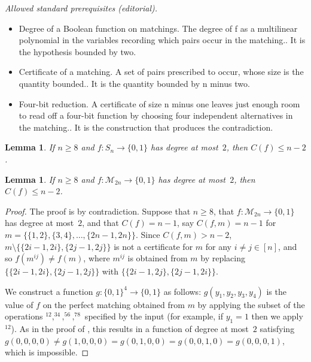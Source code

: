 \documentclass[10pt,a4paper]{article}
\newtheorem{lemma}[theorem]{Lemma}
\theoremstyle{definition}
\providecommand{\cM}{\mathcal{M}}
\begin{document}
\noindent\textit{Allowed standard prerequisites (editorial).}\begin{itemize}
\item Degree of a Boolean function on matchings. The degree of f as a multilinear polynomial in the variables recording which pairs occur in the matching.. It is the hypothesis bounded by two.
\item Certificate of a matching. A set of pairs prescribed to occur, whose size is the quantity bounded.. It is the quantity bounded by n minus two.
\item Four-bit reduction. A certificate of size n minus one leaves just enough room to read off a four-bit function by choosing four independent alternatives in the matching.. It is the construction that produces the contradiction.
\end{itemize}\medskip
\begin{lemma} \label{lem:C-bound-sym}
If $n \geq 8$ and $f\colon S_n \to \{0,1\}$ has degree at most~$2$, then $C(f) \leq n-2$.
\end{lemma}

\begin{lemma} \label{lem:C-bound-pms}
If $n \geq 8$ and $f\colon \cM_{2n} \to \{0,1\}$ has degree at most~$2$, then $C(f) \leq n-2$.
\end{lemma}

\begin{proof}
The proof is by contradiction. Suppose that $n \geq 8$, that $f\colon \cM_{2n} \to \{0,1\}$ has degree at most~$2$, and that $C(f) = n-1$, say $C(f,m) = n-1$ for $m = \bigl\{\{1,2\},\{3,4\},\ldots,\{2n-1,2n\}\bigr\}$. Since $C(f,m) > n-2$, $m \setminus \bigl\{\{2i-1,2i\},\{2j-1,2j\}\bigr\}$ is not a certificate for $m$ for any $i \neq j \in [n]$, and so $f(m^{ij}) \neq f(m)$, where $m^{ij}$ is obtained from $m$ by replacing $\bigl\{\{2i-1,2i\},\{2j-1,2j\}\bigr\}$ with $\bigl\{\{2i-1,2j\},\{2j-1,2i\}\bigr\}$.

We construct a function $g\colon \{0,1\}^4 \to \{0,1\}$ as follows: $g(y_1,y_2,y_3,y_4)$ is the value of $f$ on the perfect matching obtained from $m$ by applying the subset of the operations $^{12},^{34},^{56},^{78}$ specified by the input (for example, if $y_1 = 1$ then we apply $^{12}$). As in the proof of , this results in a function of degree at most~$2$ satisfying $g(0,0,0,0) \neq g(1,0,0,0) = g(0,1,0,0) = g(0,0,1,0) = g(0,0,0,1)$, which is impossible.
\end{proof}
\end{document}
